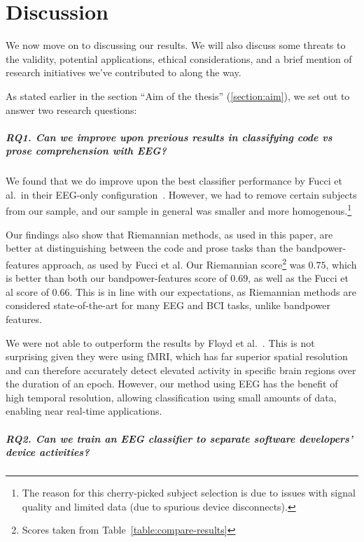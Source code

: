 \chapter{Discussion}\label{section:discussion}

We now move on to discussing our results. We will also discuss some threats to the validity, potential applications, ethical considerations, and a brief mention of research initiatives we've contributed to along the way.

As stated earlier in the section ``Aim of the thesis'' (\ref{section:aim}), we set out to answer two research questions:

\paragraph*{RQ1. Can we improve upon previous results in classifying code vs prose comprehension with EEG\@?}

We found that we do improve upon the best classifier performance by Fucci et al.\ in their EEG-only configuration~\cite{fucci_replication_2019}. However, we had to remove certain subjects from our sample, and our sample in general was smaller and more homogenous.\footnote{The reason for this cherry-picked subject selection is due to issues with signal quality and limited data (due to spurious device disconnects).}

Our findings also show that Riemannian methods, as used in this paper, are better at distinguishing between the code and prose tasks than the bandpower-features approach, as used by Fucci et al. Our Riemannian score\footnote{Scores taken from Table~\ref{table:compare-results}} was $0.75$, which is better than both our bandpower-features score of $0.69$, as well as the Fucci et al score of $0.66$. This is in line with our expectations, as Riemannian methods are considered state-of-the-art for many EEG and BCI tasks, unlike bandpower features.

We were not able to outperform the results by Floyd et al.~\cite{floyd_decoding_2017}. This is not surprising given they were using fMRI, which has far superior spatial resolution and can therefore accurately detect elevated activity in specific brain regions over the duration of an epoch. However, our method using EEG has the benefit of high temporal resolution, allowing classification using small amounts of data, enabling near real-time applications.

\paragraph*{RQ2. Can we train an EEG classifier to separate software developers’ device activities?}

